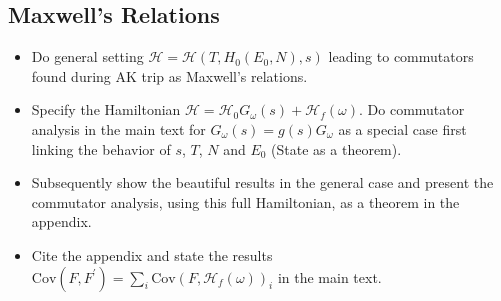 \documentclass[english,12pt]{ttuthes}
\newcommand{\Hc}{\mathcal{H}}
\begin{document}
%
\subsection{Maxwell's Relations}
\label{subsec:TACM_Maxwells_Rel}
\begin{itemize}
\item Do general setting $\Hc=\Hc(T,H_0(E_0,N),s)$ leading to
  commutators found during AK trip as Maxwell's relations.
\item Specify the Hamiltonian
  $\Hc=\Hc_0G_\omega(s)+\Hc_f(\omega)$. Do commutator
  analysis in the main text for $G_\omega(s)=g(s)G_\omega$ as a special case
  first linking the behavior of $s$, $T$, $N$ and $E_0$ (State as a
  theorem). 
\item Subsequently show the beautiful results in the general case and
  present the commutator analysis, using this full Hamiltonian, as a
  theorem in the appendix.   
\item  Cite the appendix and state the results
  $\text{Cov}(F,F^\prime)=\sum_i\text{Cov}(F,\Hc_f(\omega))_i$
  in the main text.
\end{itemize} 
%
\end{document}
